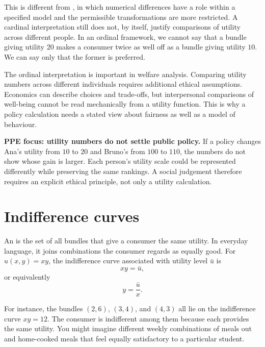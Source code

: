 This is different from , in which numerical
differences have a role within a specified model and the permissible
transformations are more restricted. A cardinal interpretation still does not,
by itself, justify comparisons of utility across different people. In an
ordinal framework, we cannot say that a bundle giving utility $20$ makes a
consumer twice as well off as a bundle giving utility $10$. We can say only
that the former is preferred.

The ordinal interpretation is important in welfare analysis. Comparing utility
numbers across different individuals requires additional ethical assumptions.
Economics can describe choices and trade-offs, but interpersonal comparisons
of well-being cannot be read mechanically from a utility function. This is why
a policy calculation needs a stated view about fairness as well as a model of
behaviour.

\begin{keyidea}
\textbf{PPE focus: utility numbers do not settle public policy.} If a policy
changes Ana's utility from $10$ to $20$ and Bruno's from $100$ to $110$, the
numbers do not show whose gain is larger. Each person's utility scale could be
represented differently while preserving the same rankings. A social judgement
therefore requires an explicit ethical principle, not only a utility
calculation.
\end{keyidea}

\section{Indifference curves}

An  is the set of all bundles that give a
consumer the same utility. In everyday language, it joins combinations the
consumer regards as equally good. For $u(x,y)=xy$, the indifference curve
associated with utility level $\bar{u}$ is
\[
xy=\bar{u},
\]
or equivalently
\[
y=\frac{\bar{u}}{x}.
\]

For instance, the bundles $(2,6)$, $(3,4)$, and $(4,3)$ all lie on the
indifference curve $xy=12$. The consumer is indifferent among them because
each provides the same utility. You might imagine different weekly
combinations of meals out and home-cooked meals that feel equally satisfactory
to a particular student.

